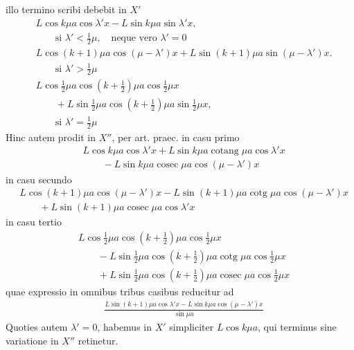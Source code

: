 illo termino scribi debebit in $X'$
\[
\begin{aligned}
&L\cos k\mu a\cos\lambda'x-L\sin k\mu a\sin\lambda'x,
\\[5pt]
&\qquad\text{si }\lambda'<\tfrac12\mu,\quad\text{neque vero }\lambda'=0\\[5pt]
&L\cos(k+1)\mu a\cos(\mu-\lambda')x+L\sin(k+1)\mu a\sin(\mu-\lambda')x.
\\[5pt]
&\qquad\text{si }\lambda'>\tfrac12\mu\\[5pt]
&L\cos\tfrac12\mu a\cos(k+\tfrac12)\mu a\cos\tfrac12\mu x\\[5pt]
&\qquad{}+L\sin\tfrac12\mu a\cos(k+\tfrac12)\mu a\sin\tfrac12\mu x,
\\[5pt]
&\qquad\text{si }\lambda'=\tfrac12\mu
\end{aligned}
\]
Hinc autem prodit in $X''$, per art. praec. in casu primo
\[
\begin{aligned}
&L\cos k\mu a\cos\lambda'x+L\sin k\mu a\operatorname{cotang}\mu a\cos\lambda'x\\[5pt]
&\qquad{}-L\sin k\mu a\operatorname{cosec}\mu a\cos(\mu-\lambda')x
\end{aligned}
\]
in casu secundo
\[
\begin{aligned}
&L\cos(k+1)\mu a\cos(\mu-\lambda')x-L\sin(k+1)\mu a\operatorname{cotg}\mu a\cos(\mu-\lambda')x\\[5pt]
&\qquad+L\sin(k+1)\mu a\operatorname{cosec}\mu a\cos\lambda'x
\end{aligned}
\]
in casu tertio
\[
\begin{aligned}
&L\cos\tfrac12\mu a\cos(k+\tfrac12)\mu a\cos\tfrac12\mu x\\[5pt]
&\qquad{}-L\sin\tfrac12\mu a\cos(k+\tfrac12)\mu a\operatorname{cotg}\mu a\cos\tfrac12\mu x\\[5pt]
&\qquad+L\sin\tfrac12\mu a\cos(k+\tfrac12)\mu a\operatorname{cosec}\mu a\cos\tfrac12\mu x
\end{aligned}
\]
quae expressio in omnibus tribus casibus reducitur ad
\[
\begin{aligned}
&\frac{L\sin(k+1)\mu a\cos\lambda'x-L\sin k\mu a\cos(\mu-\lambda')x}{\sin\mu a}
\end{aligned}
\]
Quoties autem $\lambda'=0$, habemus in $X'$ simpliciter $L\cos k\mu a$, qui terminus
sine variatione in $X''$ retinetur.

